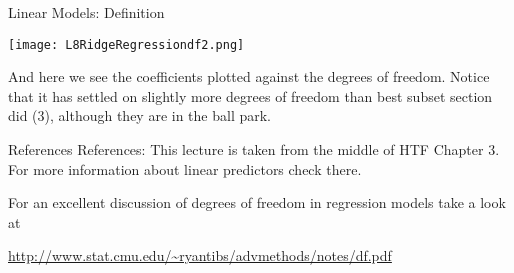 \documentclass[10pt, table, dvipsnames,xcdraw,handout]{beamer}
\begin{document}
\begin{frame}[fragile]{Linear Models: Definition}
  \begin{minipage}[t][0.5\textheight][t]{\textwidth}
	\centering \texttt{[image: L8RidgeRegressiondf2.png]} 
  \end{minipage}
  \vfill
\begin{minipage}[t][0.5\textheight][t]{\textwidth}
And here we see the coefficients plotted against the degrees of freedom. \pause Notice that it has settled on slightly more degrees of freedom than best subset section did (3), although they are in the ball park. 
\end{minipage}
\end{frame}





\begin{frame}[fragile]{References}
References: This lecture is taken from the middle of HTF Chapter 3. For more information about linear predictors check there.

For an excellent discussion of degrees of freedom in regression models take a look at

\url{http://www.stat.cmu.edu/~ryantibs/advmethods/notes/df.pdf}
\end{frame}
\end{document}
